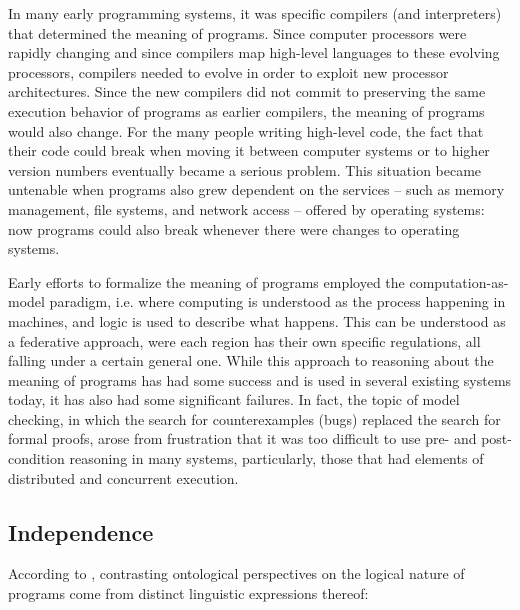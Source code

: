 \documentclass[]{article}
\begin{document}
{\color{red}{this passage is inspired by Dale's note}}


In many early programming systems, it was specific compilers (and interpreters) that determined the meaning of programs. Since computer processors were rapidly changing and since compilers map high-level languages to these evolving processors, compilers needed to evolve in order to exploit new processor architectures. Since the new compilers did not commit to preserving the same execution behavior of programs
as earlier compilers, the meaning of programs would also change. For
the many people writing high-level code, the fact that their code
could break when moving it between computer systems or to higher
version numbers eventually became a serious problem. This situation
became untenable when programs also grew dependent on the
services -- such as memory management, file systems, and network
access -- offered by operating systems: now programs could also break
whenever there were changes to operating systems.

Early efforts to formalize the meaning of programs employed the
computation-as-model paradigm, i.e. where computing is understood as the process happening in machines, and logic is used to describe what happens. This can be understood as a federative approach, were each region has their own specific regulations, all falling under a certain general one.
While this approach to reasoning about the meaning of programs has had
some success and is used in several existing systems today, it has
also had some significant failures. In fact, the topic of model
checking, in which the search for counterexamples (bugs) replaced the
search for formal proofs, arose from frustration that it was too
difficult to use pre- and post-condition reasoning in many systems,
particularly, those that had elements of distributed and concurrent execution.






\subsection{Independence}



{\color{red}{this passage is inspired by Nicola's note}}

According to \cite{turner2018}, contrasting ontological perspectives on the logical nature of programs come from distinct linguistic expressions thereof:
\end{document}
